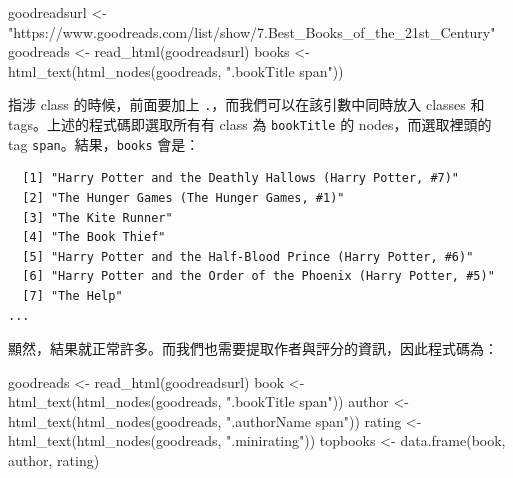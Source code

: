 \documentclass[
]{book}
\newenvironment{Shaded}{\begin{snugshade}}{\end{snugshade}}
\newcommand{\FunctionTok}[1]{\textcolor[rgb]{0.00,0.00,0.00}{#1}}
\newcommand{\NormalTok}[1]{#1}
\newcommand{\OtherTok}[1]{\textcolor[rgb]{0.56,0.35,0.01}{#1}}
\newcommand{\StringTok}[1]{\textcolor[rgb]{0.31,0.60,0.02}{#1}}
\theoremstyle{definition}
\theoremstyle{remark}
\begin{document}
\begin{Shaded}
\begin{Highlighting}[]
\NormalTok{goodreadsurl }\OtherTok{\textless{}{-}} \StringTok{"https://www.goodreads.com/list/show/7.Best\_Books\_of\_the\_21st\_Century"}
\NormalTok{goodreads }\OtherTok{\textless{}{-}} \FunctionTok{read\_html}\NormalTok{(goodreadsurl)}
\NormalTok{books }\OtherTok{\textless{}{-}} \FunctionTok{html\_text}\NormalTok{(}\FunctionTok{html\_nodes}\NormalTok{(goodreads, }\StringTok{".bookTitle span"}\NormalTok{))}
\end{Highlighting}
\end{Shaded}

指涉 class 的時候，前面要加上 \texttt{.}，而我們可以在該引數中同時放入 classes 和 tags。上述的程式碼即選取所有有 class 為 \texttt{bookTitle} 的 nodes，而選取裡頭的 tag \texttt{span}。結果，\texttt{books} 會是：

\begin{verbatim}
  [1] "Harry Potter and the Deathly Hallows (Harry Potter, #7)"                     
  [2] "The Hunger Games (The Hunger Games, #1)"                                     
  [3] "The Kite Runner"                                                             
  [4] "The Book Thief"                                                              
  [5] "Harry Potter and the Half-Blood Prince (Harry Potter, #6)"                   
  [6] "Harry Potter and the Order of the Phoenix (Harry Potter, #5)"                
  [7] "The Help"    
...
\end{verbatim}

顯然，結果就正常許多。而我們也需要提取作者與評分的資訊，因此程式碼為：

\begin{Shaded}
\begin{Highlighting}[]
\NormalTok{goodreads }\OtherTok{\textless{}{-}} \FunctionTok{read\_html}\NormalTok{(goodreadsurl)}
\NormalTok{book }\OtherTok{\textless{}{-}} \FunctionTok{html\_text}\NormalTok{(}\FunctionTok{html\_nodes}\NormalTok{(goodreads, }\StringTok{".bookTitle span"}\NormalTok{))}
\NormalTok{author }\OtherTok{\textless{}{-}} \FunctionTok{html\_text}\NormalTok{(}\FunctionTok{html\_nodes}\NormalTok{(goodreads, }\StringTok{".authorName span"}\NormalTok{))}
\NormalTok{rating }\OtherTok{\textless{}{-}} \FunctionTok{html\_text}\NormalTok{(}\FunctionTok{html\_nodes}\NormalTok{(goodreads, }\StringTok{".minirating"}\NormalTok{))}
\NormalTok{topbooks }\OtherTok{\textless{}{-}} \FunctionTok{data.frame}\NormalTok{(book, author, rating)}
\end{Highlighting}
\end{Shaded}
\end{document}
